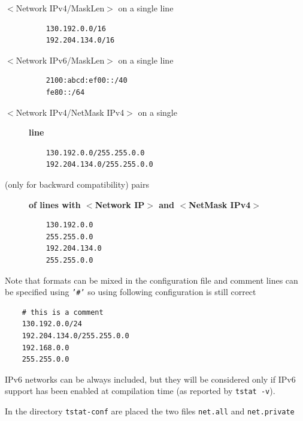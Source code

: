 \documentclass[11pt]{article}
\begin{document}
\begin{description}

\item[{$<$Network IPv4/MaskLen$>$ on a single line}] \mbox{}\begin{small}\begin{verbatim}
    130.192.0.0/16
    192.204.134.0/16
\end{verbatim}\end{small} \noindent
\item[{$<$Network IPv6/MaskLen$>$ on a single line}] \mbox{}\begin{small}\begin{verbatim}
    2100:abcd:ef00::/40
    fe80::/64
\end{verbatim}\end{small} \noindent
\item[{$<$Network IPv4/NetMask IPv4$>$ on a single}] \textbf{line}\begin{small}\begin{verbatim}
    130.192.0.0/255.255.0.0
    192.204.134.0/255.255.0.0
\end{verbatim}\end{small} \noindent
\item[{(only for backward compatibility) pairs}] \textbf{of lines with $<$Network IP$>$ and $<$NetMask IPv4$>$}\begin{small}\begin{verbatim}
    130.192.0.0
    255.255.0.0
    192.204.134.0
    255.255.0.0
\end{verbatim}\end{small} \noindent
\end{description}


Note that formats can be mixed in the configuration file and comment lines
can be specified using \texttt{'\#'} so using following
configuration is still correct

\begin{small}\begin{verbatim}
    # this is a comment
    130.192.0.0/24
    192.204.134.0/255.255.0.0
    192.168.0.0
    255.255.0.0
\end{verbatim}\end{small} \noindent
IPv6 networks can be always included, but they will be considered only if IPv6 
support has been enabled at compilation time (as reported by \texttt{tstat -v}).



In the directory \texttt{tstat-conf} are placed the two files \texttt{net.all} and
\texttt{net.private}
\end{document}
